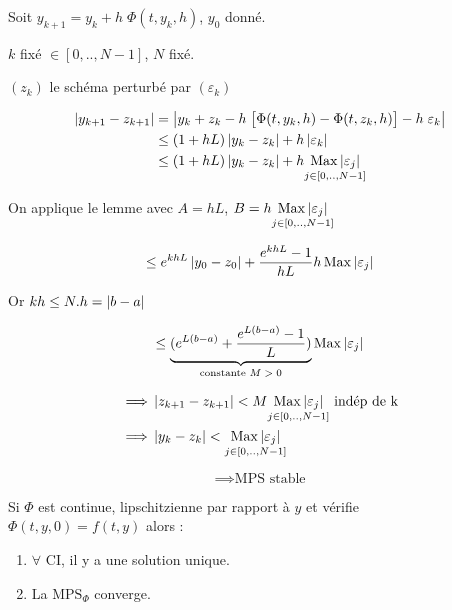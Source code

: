 \begin{preuve}
    Soit $y_{k+1} = y_k + h \; \Phi(t,y_k,h)$, $y_0$ donné.

    $k$ fixé $\in [0,..,N-1]$, $N$ fixé.
    
    $(z_k)$ le schéma perturbé par $(\varepsilon_k)$

    \begin{align*}
        \left\lvert y_{k+1} - z_{k+1}\right\rvert & = \left\lvert y_k + z_k - h \; \big[\Phi(t,y_k,h) - \Phi(t,z_k,h) \big] - h \; \varepsilon_k\right\rvert \\
        & \leq (1+hL) \left\lvert y_k - z_k\right\rvert + h \left\lvert\varepsilon_k\right\rvert \\
        & \leq (1+hL) \left\lvert y_k - z_k\right\rvert + h \underset{j \in [0,..,N-1]}{\operatorname{Max} \left\lvert\varepsilon_j\right\rvert}
    \end{align*}

    On applique le lemme avec $A = hL$, 
    $B = h \underset{j \in [0,..,N-1]}{\operatorname{Max} \left\lvert\varepsilon_j\right\rvert}$

    \[
        \leq e^{khL}\left\lvert y_0-z_0\right\rvert + \frac{e^{khL}-1}{hL} h \operatorname{Max} \left\lvert\varepsilon_j\right\rvert
    \]

    Or $kh \leq N.h = \left\lvert b-a\right\rvert$

    \[
        \leq \underbrace{ (e^{L(b-a)} + \frac{e^{L(b-a)} - 1}{L})}_{\text{constante $M>0$}} \operatorname{Max} \left\lvert\varepsilon_j\right\rvert
    \]

    \begin{align*}
        \implies & \left\lvert z_{k+1} - z_{k+1} \right\rvert < M \underset{j \in [0,..,N-1]}{\operatorname{Max} \left\lvert\varepsilon_j\right\rvert} \text{ indép de k} \\
        \implies & \left\lvert y_k - z_k\right\rvert < \underset{j \in [0,..,N-1]}{\operatorname{Max} \left\lvert\varepsilon_j\right\rvert}
    \end{align*}

    \[
        \implies \text{MPS stable}
    \]
\end{preuve}

\begin{ftheo}
    Si $\Phi$ est continue, lipschitzienne par rapport à $y$ et vérifie \\ $\Phi(t,y,0) = f(t,y)$ alors :
    \begin{enumerate}[label=(\roman*)]
        \item $\forall$ CI, il y a une solution unique.
        \item La $\text{MPS}_\Phi$ converge.
    \end{enumerate}
\end{ftheo}

